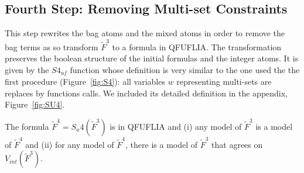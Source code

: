 \subsection{Fourth Step: Removing Multi-set Constraints}
\label{subsec:rewritting qfuflia}
This step rewrites the bag atoms and the mixed atoms in order to remove the bag terms as so transform $\tilde{F}^3$ to a formula in QFUFLIA.
The transformation preserves the boolean structure of the initial formulas and the integer atoms.
It is given by the $S4_{\textit{uf}}$ function whose definition is very similar to the one used the the first procedure (Figure~\ref{fig:S4}): all variables $w$ representing multi-sets are replaces by functions calls. We included its detailed definition in the appendix, Figure~\ref{fig:SU4}.

\begin{myprop}
\label{prop:order:final}
The formula $\tilde{F}^4 = S_{u}4(\tilde{F}^3)$ is in QFUFLIA and
(i) any model of $\tilde{F}^3$ is a model of $\tilde{F}^4$ and
(ii) for any model of $\tilde{F}^4$, there is a model of $\tilde{F}^3$ that agrees on $V_{int}(\tilde{F}^3)$.
\end{myprop}
